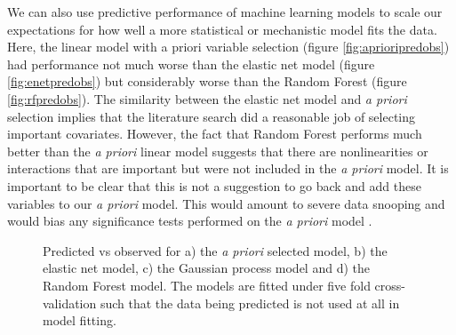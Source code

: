 \documentclass[10pt,]{article}
\begin{document}
We can also use predictive performance of machine learning models to scale our expectations for how well a more statistical or mechanistic model fits the data. Here, the linear model with a priori variable selection (figure \ref{fig:aprioripredobs}) had performance not much worse than the elastic net model (figure \ref{fig:enetpredobs}) but considerably worse than the Random Forest (figure \ref{fig:rfpredobs}). The similarity between the elastic net model and \emph{a priori} selection implies that the literature search did a reasonable job of selecting important covariates. However, the fact that Random Forest performs much better than the \emph{a priori} linear model suggests that there are nonlinearities or interactions that are important but were not included in the \emph{a priori} model. It is important to be clear that this is not a suggestion to go back and add these variables to our \emph{a priori} model. This would amount to severe data snooping and would bias any significance tests performed on the \emph{a priori} model \citep{white2000reality}.



\begin{figure}[t!]
  \centering

  \label{fig:predobs}
  \caption{
    Predicted vs observed for a) the \emph{a priori} selected model, b) the elastic net model, c) the Gaussian process model and d) the Random Forest model.
    The models are fitted under five fold cross-validation such that the data being predicted is not used at all in model fitting.
  }
\end{figure}


\end{document}
